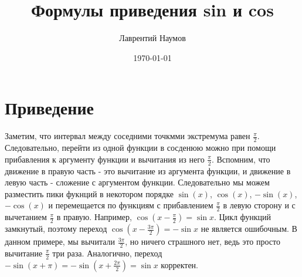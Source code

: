 \documentclass[a4paper,12pt]{article}
\author{Лаврентий Наумов}
\title{Формулы приведения sin и cos}
\date{\today}
\theoremstyle{definition}
\theoremstyle{theorem}
\begin{document}
    \maketitle
    \section{Приведение}
	Заметим, что интервал между соседними точкмми экстремума равен $\frac{\pi}{2}$. Следовательно, перейти из одной функции в сосденюю можно при помощи прибавления к аргументу функции и вычитания из него  $\frac{\pi}{2}$. Вспомним, что движение в правую часть - это вычитание из аргумента функции, и движение в левую часть - сложение с аргументом функции. Следовательно мы можем разместить пики фукнций в некотором порядке $\sin(x)$, $\cos(x)$, $-\sin(x)$, $-\cos(x)$ и перемещается по функциям с прибавлением $\frac{\pi}{2}$ в левую сторону и с вычетанием $\frac{\pi}{2}$  в правую. Например, $\cos(x -\frac{\pi}{2})=\sin x$. Цикл функций замкнутый, поэтому переход $\cos(x-\frac{3\pi}{2}) = -\sin x$ не является ошибочным. В данном примере, мы вычитали $\frac{3\pi}{2}$, но ничего страшного нет, ведь это просто вычитание $\frac{\pi}{2}$ три раза. Аналогично, переход $-\sin(x + \pi) = - \sin(x + \frac{2\pi}{2}) = \sin x$ корректен.
\end{document}
